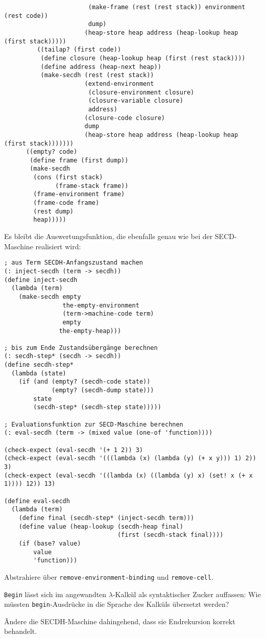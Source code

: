 \begin{lstlisting}
                       (make-frame (rest (rest stack)) environment (rest code))
                       dump)
                      (heap-store heap address (heap-lookup heap (first stack)))))
         ((tailap? (first code))
          (define closure (heap-lookup heap (first (rest stack))))
          (define address (heap-next heap))
          (make-secdh (rest (rest stack))
                      (extend-environment
                       (closure-environment closure)
                       (closure-variable closure)
                       address)
                      (closure-code closure)
                      dump
                      (heap-store heap address (heap-lookup heap (first stack)))))))
      ((empty? code)
       (define frame (first dump))
       (make-secdh
        (cons (first stack)
              (frame-stack frame))
        (frame-environment frame)
        (frame-code frame)
        (rest dump)
        heap)))))
\end{lstlisting}
Es bleibt die Auswertungsfunktion, die ebenfalls genau wie bei der
SECD-Maschine realisiert wird:
%
\begin{lstlisting}
; aus Term SECDH-Anfangszustand machen
(: inject-secdh (term -> secdh))
(define inject-secdh
  (lambda (term)
    (make-secdh empty
                the-empty-environment
                (term->machine-code term)
                empty
               the-empty-heap)))

; bis zum Ende Zustandsübergänge berechnen
(: secdh-step* (secdh -> secdh))
(define secdh-step*
  (lambda (state)
    (if (and (empty? (secdh-code state))
             (empty? (secdh-dump state)))
        state
        (secdh-step* (secdh-step state)))))

; Evaluationsfunktion zur SECD-Maschine berechnen
(: eval-secdh (term -> (mixed value (one-of 'function))))

(check-expect (eval-secdh '(+ 1 2)) 3)
(check-expect (eval-secdh '(((lambda (x) (lambda (y) (+ x y))) 1) 2)) 3)
(check-expect (eval-secdh '((lambda (x) ((lambda (y) x) (set! x (+ x 1)))) 12)) 13)

(define eval-secdh
  (lambda (term)
    (define final (secdh-step* (inject-secdh term)))
    (define value (heap-lookup (secdh-heap final)
                               (first (secdh-stack final))))
    (if (base? value)
        value
        'function)))
\end{lstlisting}


\begin{aufgabe}
  Abstrahiere über \lstinline{remove-environment-binding} und
  \lstinline{remove-cell}.
\end{aufgabe}


\begin{aufgabe}
  \lstinline{Begin} lässt sich im angewandten $\lambda$-Kalkül als
  syntaktischer Zucker auffassen: Wie müssten \lstinline{begin}-Ausdrücke
  in die Sprache des Kalküls übersetzt werden?
\end{aufgabe}

\begin{aufgabe}
  Ãndere die SECDH-Maschine dahingehend, dass
  sie Endrekursion korrekt behandelt.
\end{aufgabe}

